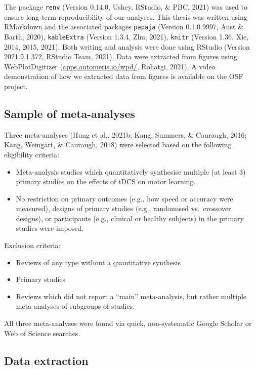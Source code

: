 \documentclass[
  man,floatsintext]{apa6}
\providecommand{\tightlist}{%
  \setlength{\itemsep}{0pt}\setlength{\parskip}{0pt}}
\begin{document}
The package \texttt{renv} (Version 0.14.0, Ushey, RStudio, \& PBC, 2021) was used to ensure long-term reproducibility of our analyses. This thesis was written using RMarkdown and the associated packages \texttt{papaja} (Version 0.1.0.9997, Aust \& Barth, 2020), \texttt{kableExtra} (Version 1.3.4, Zhu, 2021), \texttt{knitr} (Version 1.36, Xie, 2014, 2015, 2021). Both writing and analysis were done using RStudio (Version 2021.9.1.372, RStudio Team, 2021). Data were extracted from figures using WebPlotDigitizer (\href{https://apps.automeris.io/wpd/}{apps.automeris.io/wpd/}, Rohatgi, 2021). A video demonstration of how we extracted data from figures is available on the OSF project.

\hypertarget{sample-of-meta-analyses}{%
\subsection{Sample of meta-analyses}\label{sample-of-meta-analyses}}

Three meta-analyses (Hung et al., 2021b; Kang, Summers, \& Cauraugh, 2016; Kang, Weingart, \& Cauraugh, 2018) were selected based on the following eligibility criteria:

\begin{itemize}
\tightlist
\item
  Meta-analysis studies which quantitatively synthesise multiple (at least 3) primary studies on the effects of tDCS on motor learning.
\item
  No restriction on primary outcomes (e.g., how speed or accuracy were measured), designs of primary studies (e.g., randomised vs.~crossover designs), or participants (e.g., clinical or healthy subjects) in the primary studies were imposed.
\end{itemize}

Exclusion criteria:

\begin{itemize}
\tightlist
\item
  Reviews of any type without a quantitative synthesis
\item
  Primary studies
\item
  Reviews which did not report a ``main'' meta-analysis, but rather multiple meta-analyses of subgroups of studies.
\end{itemize}

All three meta-analyses were found via quick, non-systematic Google Scholar or Web of Science searches.

\hypertarget{data-extraction}{%
\subsection{Data extraction}\label{data-extraction}}
\end{document}
